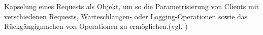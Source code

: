 \glqq Kapselung eines Requests als Objekt, um so die Parametrisierung von Clients mit verschiedenen Requests, Warteschlangen- oder Logging-Operationen sowie das Rückgängigmachen von Operationen zu ermöglichen.\grqq (vgl. \cite{GOF95})